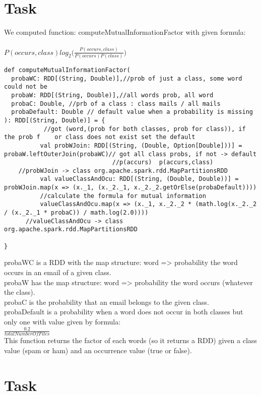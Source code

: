 \documentclass[paper=a4, fontsize=11pt]{scrartcl}
\numberwithin{equation}{section}		%
\numberwithin{figure}{section}			%
\numberwithin{table}{section}				%
\begin{document}
\section{Task}
We computed function: computeMutualInformationFactor with given formula: \\ \\
$P(occurs, class)log_2 \Big(\frac{P(occurs, class)}{P(occurs)P(class)}\Big)$ \\
\begin{lstlisting}
def computeMutualInformationFactor(
  probaWC: RDD[(String, Double)],//prob of just a class, some word could not be 
  probaW: RDD[(String, Double)],//all words prob, all word
  probaC: Double, //prb of a class : class mails / all mails
  probaDefault: Double // default value when a probability is missing
): RDD[(String, Double)] = {
           //got (word,(prob for both classes, prob for class)), if the prob f    or class does not exist set the default 
          val probWJoin: RDD[(String, (Double, Option[Double]))] = probaW.leftOuterJoin(probaWC)// got all class probs, if not -> default
                              //p(accurs)  p(accurs,class) 
	//probWJoin -> class org.apache.spark.rdd.MapPartitionsRDD
          val valueClassAndOcu: RDD[(String, (Double, Double))] = probWJoin.map(x => (x._1, (x._2._1, x._2._2.getOrElse(probaDefault))))
          //calculate the formula for mutual information
          valueClassAndOcu.map(x => (x._1, x._2._2 * (math.log(x._2._2 / (x._2._1 * probaC)) / math.log(2.0))))
	  //valueClassAndOcu -> class org.apache.spark.rdd.MapPartitionsRDD

}
\end{lstlisting}

probaWC is a RDD with the map structure: word => probability the word occurs in an email of a given class. \\
probaW has the map structure: word => probability the word occurs (whatever the class).\\ 
probaC is the probability that an email belongs to the given class. \\
probaDefault is a probability when a word does not occur in both classes but only one with value given by formula: \\
$\frac{0.2}{totalNumberOfFiles}$\\
This function returns the factor of each words (so it returns a RDD) given a class value (spam or ham) and an occurrence value
(true or false).

\section{Task}
\end{document}
